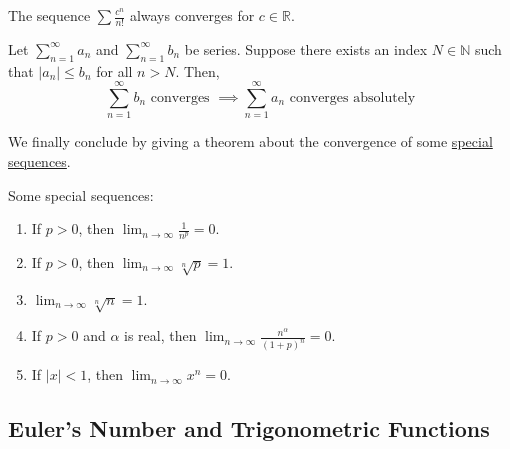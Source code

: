   \begin{example}
    \label{ex:sequence-always-converges}
    The sequence $\sum \frac{c^n}{n!}$ always converges for $c \in \mathbb{R}$. 
  \end{example}

  \begin{theorem}
    \label{thm:weierstrass-m-test-for-absolute-convergence}
    Let $\sum_{n=1}^\infty a_n$ and $\sum_{n=1}^\infty b_n$ be series. Suppose there exists an index $N \in \mathbb{N}$ such that $|a_n| \leq b_n$ for all $n>N$. Then, 
    \begin{equation}
      \sum_{n=1}^\infty b_n \text{ converges } \implies \sum_{n=1}^\infty a_n \text{ converges absolutely}
    \end{equation}
  \end{theorem}

  We finally conclude by giving a theorem about the convergence of some \hyperref[thm:special-sequences]{special sequences}. 

  \begin{theorem}
    \label{thm:special-sequences}
    Some special sequences: 
    \begin{enumerate}
      \item If $p > 0$, then $\lim_{n \rightarrow \infty} \frac{1}{n^p} = 0$. 
      
      \item If $p > 0$, then $\lim_{n \rightarrow \infty} \sqrt[n]{p} = 1$. 

      \item $\lim_{n \rightarrow \infty} \sqrt[n]{n} = 1$. 

      \item If $p > 0$ and $\alpha$ is real, then $\lim_{n \rightarrow \infty} \frac{n^\alpha}{(1 + p)^n} = 0$. 
      
      \item If $|x| < 1$, then $\lim_{n \rightarrow \infty} x^n = 0$. 
    \end{enumerate}
  \end{theorem}

\subsection{Euler's Number and Trigonometric Functions} 

